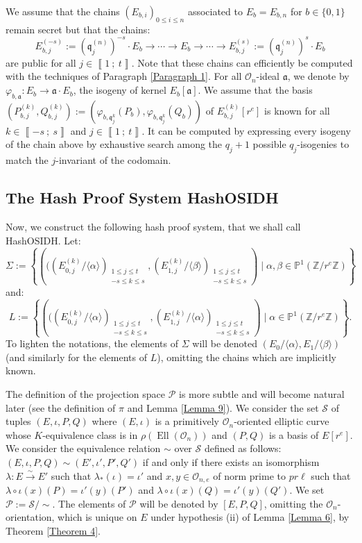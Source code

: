 \documentclass[a4paper,10pt,notitlepage]{report}
\theoremstyle{definition}
\theoremstyle{plain}
\theoremstyle{definition}
\newcommand{\Z}{\mathbb{Z}}
\newcommand{\m}[1]{\mathcal{#1}}
\newcommand{\mO}{\mathcal{O}}
\renewcommand{\i}[2]{\left\llbracket #1~;~#2\right\rrbracket}
\renewcommand{\(}{\left(}
\renewcommand{\)}{\right)}
\renewcommand{\P}{\mathbb{P}}
\newcommand{\mf}[1]{\mathfrak{#1}}
\DeclareMathOperator{\Ell}{Ell}
\begin{document}
We assume that the chains $(E_{b,i})_{0\leq i\leq n}$ associated to $E_b=E_{b,n}$ for $b\in\{0,1\}$ remain secret but that the chains:
\[E_{b,j}^{(-s)}:=(\mf{q}_j^{(n)})^{-s}\cdot E_b\longrightarrow \cdots \longrightarrow E_{b}\longrightarrow \cdots\longrightarrow E_{b,j}^{(s)}:=(\mf{q}_j^{(n)})^{s}\cdot E_b\]
are public for all $j\in\i{1}{t}$. Note that these chains can efficiently be computed with the techniques of Paragraph \ref{Paragraph 1}.  For all $\mO_n$-ideal $\mf{a}$, we denote by $\varphi_{b,\mf{a}}:E_b\longrightarrow \mf{a}\cdot E_b$, the isogeny of kernel $E_b[\mf{a}]$. We assume that the basis $(P_{b,j}^{(k)},Q_{b,j}^{(k)}):=(\varphi_{b,\mf{q}_j^{k}}(P_b),\varphi_{b,\mf{q}_j^{k}}(Q_b))$ of $E_{b,j}^{(k)}[r^e]$ is known for all $k\in\i{-s}{s}$ and $j\in\i{1}{t}$. It can be computed by expressing every isogeny of the chain above by exhaustive search among the $q_j+1$ possible $q_j$-isogenies to match the $j$-invariant of the codomain.

\subsection{The Hash Proof System HashOSIDH}

Now, we construct the following hash proof system, that we shall call HashOSIDH. Let:
\[\Sigma:=\left\{\(((E_{0,j}^{(k)}/\langle\alpha\rangle)_{\substack{1\leq j\leq t\\ -s\leq k\leq s}}, (E_{1,j}^{(k)}/\langle\beta \rangle)_{\substack{1\leq j\leq t\\ -s\leq k\leq s}}\)\mid \alpha,\beta\in\P^1(\Z/r^e\Z)\right\}\]
and:
\[L:=\left\{\(((E_{0,j}^{(k)}/\langle\alpha\rangle)_{\substack{1\leq j\leq t\\ -s\leq k\leq s}}, (E_{1,j}^{(k)}/\langle\alpha \rangle)_{\substack{1\leq j\leq t\\ -s\leq k\leq s}}\)\mid \alpha\in\P^1(\Z/r^e\Z)\right\}.\]
To lighten the notations, the elements of $\Sigma$ will be denoted $(E_0/\langle\alpha\rangle, E_1/\langle\beta\rangle)$ (and similarly for the elements of $L$), omitting the chains which are implicitly known. 

The definition of the projection space $\m{P}$ is more subtle and will become natural later (see the definition of $\pi$ and Lemma \ref{Lemma 9}). We consider the set $\m{S}$ of tuples $(E,\iota,P,Q)$ where $(E,\iota)$ is a primitively $\mO_n$-oriented elliptic curve whose $K$-equivalence class is in $\rho(\Ell(\mO_n))$ and $(P,Q)$ is a basis of $E[r^e]$. We consider the equivalence relation $\sim$ over $\m{S}$ defined as follows: $(E,\iota,P,Q)\sim (E',\iota',P',Q')$ if and only if there exists an isomorphism $\lambda : E\overset{\sim}{\longrightarrow} E'$ such that $\lambda_*(\iota)=\iota'$ and $x, y\in\mO_{n,e}$ of norm prime to $p r\ell$ such that $\lambda\circ\iota(x)(P)=\iota'(y)(P')$ and $\lambda\circ\iota(x)(Q)=\iota'(y)(Q')$. We set $\m{P}:=\m{S}/\sim$. The elements of $\m{P}$ will be denoted by $[E,P,Q]$, omitting the $\mO_n$-orientation, which is unique on $E$ under hypothesis (ii) of Lemma \ref{Lemma 6}, by Theorem \ref{Theorem 4}. 
\end{document}
